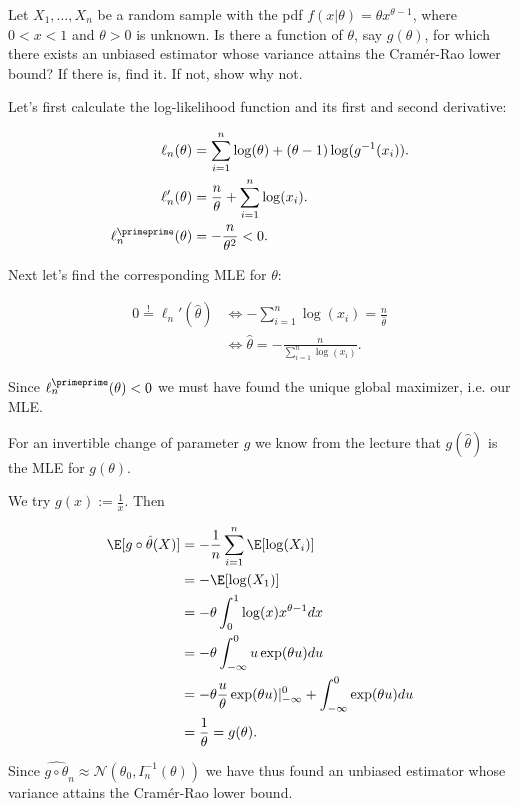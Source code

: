 
\begin{exercise}

Let $X_1,\dots,X_n$ be a random sample with the pdf $f(x|\theta) = \theta x^{\theta -1}$,
where $0 < x < 1$ and $\theta > 0$ is unknown. Is there a function of $\theta$,
say $g(\theta)$, for which there exists an unbiased estimator whose
variance attains the Cramér-Rao lower bound? If there is, find it.
If not, show why not.
  
\end{exercise}
  
  
\begin{solution}
  
Let's first calculate the log-likelihood function and its first and 
second derivative:

\begin{align*}
    \ell_n(\theta) &= \sum_{i=1}^n \log(\theta) + (\theta - 1)\log(g^{-1}(x_i)). \\
    \ell_n'(\theta) &= \frac{n}{\theta} + \sum_{i=1}^n\log(x_i). \\
    \ell_n^{\primeprime}(\theta) &= -\frac{n}{\theta^2} < 0.
\end{align*}
  
Next let's find the corresponding MLE for $\theta$:

\begin{align*}
    0 \stackrel{!}{=} \ell_n'(\hat{\theta})
    &\iff -\sum_{i=1}^n\log(x_i) = \frac{n}{\hat{\theta}} \\
    &\iff \hat{\theta} = -\frac{n}{\sum_{i=1}^n\log(x_i)}.
\end{align*}

Since $\ell_n^{\primeprime}(\theta) < 0$ we must have found
the unique global maximizer, i.e. our MLE.


For an invertible change of parameter $g$ we know from the lecture that
$g(\hat{\theta})$ is the MLE for $g(\theta)$.

We try $g(x) := \frac{1}{x}$. Then 

\begin{align*}
    \E[g \circ \hat{\theta}(X)] &= 
    -\frac{1}{n}\sum_{i=1}^n\E[\log(X_i)] \\
    &= -\E[\log(X_1)]  \\
    &= - \theta \int_0^1 \log(x)x^{\theta - 1} dx \\
    &= - \theta \int_{-\infty}^0 u\exp(\theta u ) du \\
    &= - \theta \frac{u}{\theta}\exp(\theta u)|_{-\infty}^0 + \int_{-\infty}^0 \exp(\theta u) du \\
    &= \frac{1}{\theta} = g(\theta).
\end{align*}

Since $\hat{g \circ \theta}_n \approx \mathcal{N}(\theta_0, I_n^{-1}(\theta))$
we have thus found an unbiased estimator whose variance attains the Cramér-Rao lower bound.
\end{solution}
  
  